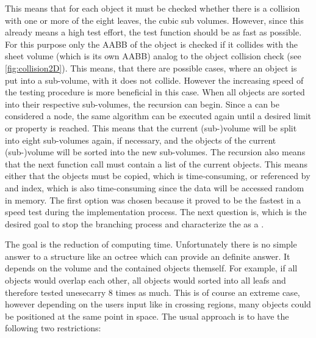 This means that for each object it must be checked whether there is a collision with one or more of the eight leaves, \ie the cubic sub volumes.
However, since this already means a high test effort, the test function should be as fast as possible.
For this purpose only the \ac{AABB} of the object is checked if it collides with the sheet volume (which is its own \ac{AABB}) analog to the object collision check (see \cref{fig:collision2D}).
This means, that there are possible cases, where an object is put into a sub-volume, with it does not collide.
However the increasing speed of the testing procedure is more beneficial in this case.
%
When all objects are sorted into their respective sub-volumes, the recursion can begin.
Since a  can be considered a node, the same algorithm can be executed again until a desired limit or property is reached.
This means that the current (sub-)volume will be split into eight sub-volumes again, if necessary, and the objects of the current (sub-)volume will be sorted into the new sub-volumes.
The recursion also means that the next function call must contain a list of the current objects.
This means either that the objects must be copied, which is time-consuming, or referenced by \eg{} and index, which is also time-consuming since the data will be accessed random in memory.
The first option was chosen because it proved to be the fastest in a speed test during the implementation process.
The next question is, which is the desired goal to stop the branching process and characterize the  as a .
\par
%
The goal is the reduction of computing time.
Unfortunately there is no simple answer to a structure like an octree which can provide an definite answer.
It depends on the volume and the contained objects themself.
For example, if all objects would overlap each other, all objects would sorted into all leafs and therefore tested unesecarry 8 times as much.
This is of course an extreme case, however depending on the users input like in crossing regions, many objects could be positioned at the same point in space.
The usual approach is to have the following two restrictions:
%
